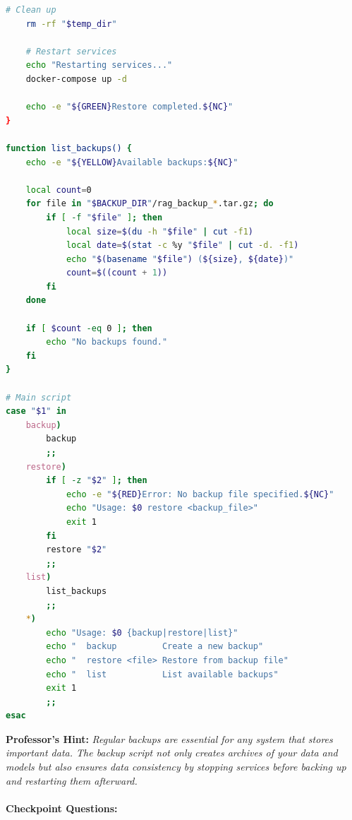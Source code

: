 \documentclass[
  screen,review,acmlarge]{acmart}
\begin{document}
\begin{lstlisting}[language=bash]
    # Clean up
    rm -rf "$temp_dir"
    
    # Restart services
    echo "Restarting services..."
    docker-compose up -d
    
    echo -e "${GREEN}Restore completed.${NC}"
}

function list_backups() {
    echo -e "${YELLOW}Available backups:${NC}"
    
    local count=0
    for file in "$BACKUP_DIR"/rag_backup_*.tar.gz; do
        if [ -f "$file" ]; then
            local size=$(du -h "$file" | cut -f1)
            local date=$(stat -c %y "$file" | cut -d. -f1)
            echo "$(basename "$file") (${size}, ${date})"
            count=$((count + 1))
        fi
    done
    
    if [ $count -eq 0 ]; then
        echo "No backups found."
    fi
}

# Main script
case "$1" in
    backup)
        backup
        ;;
    restore)
        if [ -z "$2" ]; then
            echo -e "${RED}Error: No backup file specified.${NC}"
            echo "Usage: $0 restore <backup_file>"
            exit 1
        fi
        restore "$2"
        ;;
    list)
        list_backups
        ;;
    *)
        echo "Usage: $0 {backup|restore|list}"
        echo "  backup         Create a new backup"
        echo "  restore <file> Restore from backup file"
        echo "  list           List available backups"
        exit 1
        ;;
esac
\end{lstlisting}

\textbf{Professor's Hint:} \emph{Regular backups are essential for any system that stores important data. The backup script not only creates archives of your data and models but also ensures data consistency by stopping services before backing up and restarting them afterward.}

\paragraph{Checkpoint Questions:}\label{checkpoint-questions-7}
\end{document}
